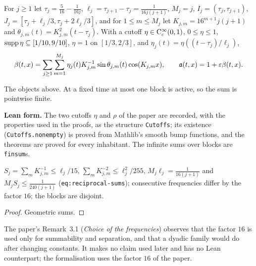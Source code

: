 For $j\geq1$ let $\tau_j=\frac5{16}-\frac1{16j}$, $\ell_j=\tau_{j+1}-\tau_j=\frac1{16j(j+1)}$,
$M_j=j$, $I_j=(\tau_j,\tau_{j+1})$, $J_j=[\tau_j+\ell_j/3,\tau_j+2\ell_j/3]$, and for
$1\leq m\leq M_j$ let $K_{j,m}=16^{m+1}j(j+1)$ and $\theta_{j,m}(t)=K_{j,m}^2(t-\tau_j)$.  With a
cutoff $\eta\in\mathrm{C}_c^\infty(0,1)$, $0\leq\eta\leq1$, $\operatorname{supp}\eta\subseteq[1/10,9/10]$,
$\eta=1$ on $[1/3,2/3]$, and $\eta_j(t)=\eta((t-\tau_j)/\ell_j)$,
\[
  \beta(t,x)=\sum_{j\geq1}\sum_{m=1}^{M_j}\eta_j(t)K_{j,m}^{-1}\sin\theta_{j,m}(t)\cos(K_{j,m}x),
  \qquad \mathfrak{a}(t,x)=1+\varepsilon\beta(t,x).
\]

\begin{definition}
  \label{def:coefficient}
  \leanok
  The objects above.  At a fixed time at most one block is active, so the sum is pointwise
  finite.
\end{definition}

\textbf{Lean form.}  The two cutoffs $\eta$ and $\rho$ of the paper are recorded, with the
properties used in the proofs, as the structure \texttt{Cutoffs}; its existence
(\texttt{Cutoffs.nonempty}) is proved from Mathlib's smooth bump functions, and the theorems
are proved for every inhabitant.  The infinite sums over blocks are \texttt{finsum}s.

\begin{lemma}
  \label{lem:reciprocal-sums}
  \leanok
  $S_j=\sum_mK_{j,m}^{-1}\leq\ell_j/15$, $\sum_mK_{j,m}^{-2}\leq\ell_j^2/255$,
  $M_j\ell_j=\frac1{16(j+1)}$ and $M_jS_j\leq\frac1{240(j+1)}$
  (\texttt{eq:reciprocal-sums}); consecutive frequencies differ by the factor $16$; the
  blocks are disjoint.
\end{lemma}

\begin{proof}
  \leanok
  Geometric sums.
\end{proof}

The paper's Remark~3.1 (\emph{Choice of the frequencies}) observes that the factor $16$ is used
only for summability and separation, and that a dyadic family would do after changing
constants.  It makes no claim used later and has no Lean counterpart; the formalisation uses the
factor $16$ of the paper.

